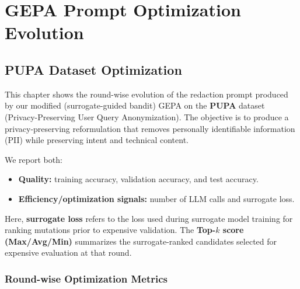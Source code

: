 \chapter{GEPA Prompt Optimization Evolution}
\label{ch:prompt_evolution}

\section{PUPA Dataset Optimization}
This chapter shows the round-wise evolution of the redaction prompt produced by our modified (surrogate-guided bandit) GEPA on the \textbf{PUPA} dataset (Privacy-Preserving User Query Anonymization). The objective is to produce a privacy-preserving reformulation that removes personally identifiable information (PII) while preserving intent and technical content.

We report both:
\begin{itemize}
    \item \textbf{Quality:} training accuracy, validation accuracy, and test accuracy.
    \item \textbf{Efficiency/optimization signals:} number of LLM calls and surrogate loss.
\end{itemize}
Here, \textbf{surrogate loss} refers to the loss used during surrogate model training for ranking mutations prior to expensive validation. The \textbf{Top-$k$ score (Max/Avg/Min)} summarizes the surrogate-ranked candidates selected for expensive evaluation at that round.

\subsection{Round-wise Optimization Metrics}
\begin{table}[H]
\centering
\small
\caption{GEPA bandit optimization metrics across rounds (\textit{PUPA}).}
\label{tab:pupa_bandit_metrics}
\end{table}

